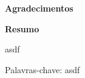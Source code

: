 \documentclass[12pt, a4paper, twoside]{report}
\numberwithin{equation}{subsection} %
\begin{document}




\vspace*{2.5cm}

\begin{center}
 {\Huge \bfseries Agradecimentos}
\end{center}
\baselineskip 19.5pt 
\vspace*{1.5cm}


\newpage


\vspace*{2.5cm}
\begin{center}
 {\Huge \bfseries Resumo}
\end{center}
\baselineskip 19.5pt 
\vspace*{1.5cm}

asdf

\vspace*{1.5cm}

Palavras-chave: asdf

  
\newpage



\listoftables
\end{document}
